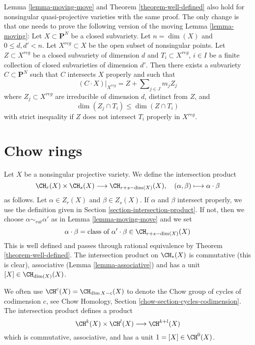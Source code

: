 \begin{remark}
\label{remark-quasi-projective}
Lemma \ref{lemma-moving-move} and
Theorem \ref{theorem-well-defined}
also hold for nonsingular quasi-projective varieties with
the same proof. The only change is that one needs to prove the following
version of the moving Lemma \ref{lemma-moving}: Let  $X \subset \mathbf{P}^N$
be a closed subvariety. Let $n = \dim(X)$ and $0 \leq d, d' < n$. Let
$X^{reg} \subset X$ be the open subset of nonsingular points. Let
$Z \subset X^{reg}$ be a closed subvariety of dimension $d$ and
$T_i \subset X^{reg}$, $i \in I$ be a finite collection of closed subvarieties
of dimension $d'$. Then there exists a subvariety $C \subset \mathbf{P}^N$
such that $C$ intersects $X$ properly and such that
$$
(C \cdot X)|_{X^{reg}} = Z + \sum\nolimits_{j \in J} m_j Z_j
$$
where $Z_j \subset X^{reg}$ are irreducible of dimension $d$, distinct
from $Z$, and
$$
\dim(Z_j \cap T_i) \leq \dim(Z \cap T_i)
$$
with strict inequality if $Z$ does not intersect $T_i$ properly in $X^{reg}$.
\end{remark}



\section{Chow rings}
\label{section-chow-rings}

\noindent
Let $X$ be a nonsingular projective variety. We define the intersection
product
$$
\CH_r(X) \times \CH_s(X) \longrightarrow \CH_{r + s - \dim(X)}(X),\quad
(\alpha, \beta) \longmapsto \alpha \cdot \beta
$$
as follows. Let $\alpha \in Z_r(X)$ and $\beta \in Z_s(X)$.
If $\alpha$ and $\beta$ intersect properly, we use the
definition given in Section \ref{section-intersection-product}.
If not, then we choose $\alpha \sim_{rat} \alpha'$ as in
Lemma \ref{lemma-moving-move} and we set
$$
\alpha \cdot \beta =
\text{class of }\alpha' \cdot \beta \in \CH_{r + s - \dim(X)}(X)
$$
This is well defined and passes through rational equivalence by
Theorem \ref{theorem-well-defined}. The intersection product
on $\CH_*(X)$ is commutative (this is clear), associative
(Lemma \ref{lemma-associative}) and has a unit $[X] \in \CH_{\dim(X)}(X)$.

\medskip\noindent
We often use $\CH^c(X) = \CH_{\dim X - c}(X)$ to denote the Chow group of
cycles of codimension $c$, see
Chow Homology, Section \ref{chow-section-cycles-codimension}.
The intersection product defines a product
$$
\CH^k(X) \times \CH^l(X) \longrightarrow \CH^{k + l}(X)
$$
which is commutative, associative, and has a unit $1 = [X] \in \CH^0(X)$.


